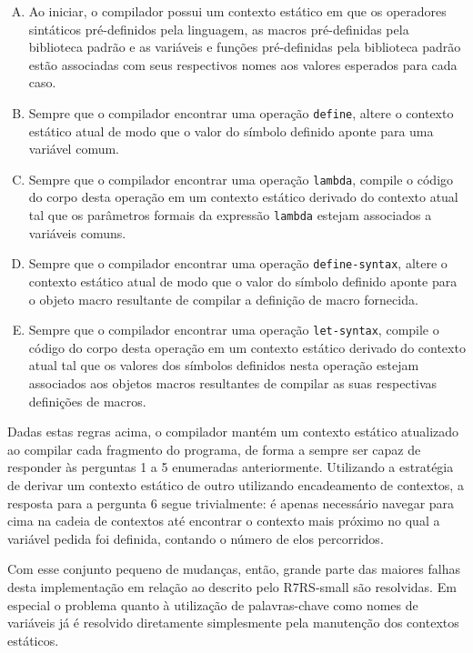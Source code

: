 \begin{enumerate}[(A)]

\item Ao iniciar, o compilador possui um contexto estático em que os operadores
sintáticos pré-definidos pela linguagem, as macros pré-definidas pela
biblioteca padrão e as variáveis e funções pré-definidas pela biblioteca padrão
estão associadas com seus respectivos nomes aos valores esperados para cada
caso.

\item Sempre que o compilador encontrar uma operação \texttt{define}, altere o contexto
estático atual de modo que o valor do símbolo definido aponte para uma variável
comum.

\item Sempre que o compilador encontrar uma operação \texttt{lambda}, compile o código
do corpo desta operação em um contexto estático derivado do contexto atual tal
que os parâmetros formais da expressão \texttt{lambda} estejam associados a variáveis
comuns.

\item Sempre que o compilador encontrar uma operação \texttt{define-syntax}, altere o
contexto estático atual de modo que o valor do símbolo definido aponte para o
objeto macro resultante de compilar a definição de macro fornecida.

\item Sempre que o compilador encontrar uma operação \texttt{let-syntax}, compile o
código do corpo desta operação em um contexto estático derivado do contexto
atual tal que os valores dos símbolos definidos nesta operação estejam
associados aos objetos macros resultantes de compilar as suas respectivas
definições de macros.

\end{enumerate}

Dadas estas regras acima, o compilador mantém um contexto estático atualizado
ao compilar cada fragmento do programa, de forma a sempre ser capaz de
responder às perguntas 1 a 5 enumeradas anteriormente. Utilizando a estratégia
de derivar um contexto estático de outro utilizando encadeamento de contextos,
a resposta para a pergunta 6 segue trivialmente: é apenas necessário navegar
para cima na cadeia de contextos até encontrar o contexto mais próximo no qual
a variável pedida foi definida, contando o número de elos percorridos.

Com esse conjunto pequeno de mudanças, então, grande parte das maiores falhas desta
implementação em relação ao descrito pelo \acs{R7RS}-small são resolvidas.
Em especial o problema quanto à utilização de palavras-chave como nomes de variáveis
já é resolvido diretamente simplesmente pela manutenção dos contextos estáticos.
